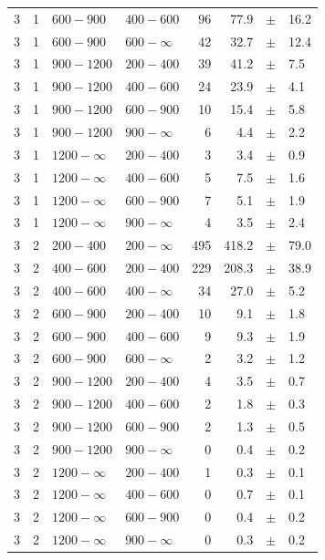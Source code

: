 \begin{table}[!h]
\begin{tabular}{rrllrrcl}
3 & 1 & $ 600- 900$ & $400-600$ &     96 &     77.9 &$\pm$&   16.2 \\
3 & 1 & $ 600- 900$ & $600-\infty$ &     42 &     32.7 &$\pm$&   12.4 \\
3\T & 1 & $ 900-1200$ & $200-400$ &     39 &     41.2 &$\pm$&    7.5 \\
3 & 1 & $ 900-1200$ & $400-600$ &     24 &     23.9 &$\pm$&    4.1 \\
3 & 1 & $ 900-1200$ & $600-900$ &     10 &     15.4 &$\pm$&    5.8 \\
3 & 1 & $ 900-1200$ & $900-\infty$ &      6 &      4.4 &$\pm$&    2.2 \\
3\T & 1 & $1200- \infty$ & $200-400$ &      3 &      3.4 &$\pm$&    0.9 \\
3 & 1 & $1200- \infty$ & $400-600$ &      5 &      7.5 &$\pm$&    1.6 \\
3 & 1 & $1200- \infty$ & $600-900$ &      7 &      5.1 &$\pm$&    1.9 \\
3 & 1 & $1200- \infty$ & $900-\infty$ &      4 &      3.5 &$\pm$&    2.4 \\
3\T & 2 & $ 200- 400$ & $200-\infty$ &    495 &    418.2 &$\pm$&   79.0 \\
3\T & 2 & $ 400- 600$ & $200-400$ &    229 &    208.3 &$\pm$&   38.9 \\
3 & 2 & $ 400- 600$ & $400-\infty$ &     34 &     27.0 &$\pm$&    5.2 \\
3\T & 2 & $ 600- 900$ & $200-400$ &     10 &      9.1 &$\pm$&    1.8 \\
3 & 2 & $ 600- 900$ & $400-600$ &      9 &      9.3 &$\pm$&    1.9 \\
3 & 2 & $ 600- 900$ & $600-\infty$ &      2 &      3.2 &$\pm$&    1.2 \\
3\T & 2 & $ 900-1200$ & $200-400$ &      4 &      3.5 &$\pm$&    0.7 \\
3 & 2 & $ 900-1200$ & $400-600$ &      2 &      1.8 &$\pm$&    0.3 \\
3 & 2 & $ 900-1200$ & $600-900$ &      2 &      1.3 &$\pm$&    0.5 \\
3 & 2 & $ 900-1200$ & $900-\infty$ &      0 &      0.4 &$\pm$&    0.2 \\
3\T & 2 & $1200- \infty$ & $200-400$ &      1 &      0.3 &$\pm$&    0.1 \\
3 & 2 & $1200- \infty$ & $400-600$ &      0 &      0.7 &$\pm$&    0.1 \\
3 & 2 & $1200- \infty$ & $600-900$ &      0 &      0.4 &$\pm$&    0.2 \\
3 & 2 & $1200- \infty$ & $900-\infty$ &      0 &      0.3 &$\pm$&    0.2 \\

\end{tabular}
\end{table}
